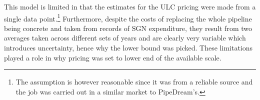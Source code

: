 \documentclass[11pt]{article}		%
\newcommand{\supercite}[1]{\textsuperscript{\cite{#1}}}		%
\newcommand{\sectref}[1]{\hyperref[#1]{Section \ref*{#1}}}     %
\begin{document}
	           This model is limited in that the estimates for the ULC pricing were made from a single data point.\footnote{The assumption is however reasonable since it was from a reliable source and the job was carried out in a similar market to PipeDream’s.} Furthermore, despite the costs of replacing the whole pipeline being concrete and taken from records of SGN expenditure, they result from two averages taken across different sets of years and are clearly very variable which introduces uncertainty, hence why the lower bound was picked. These limitations played a role in why pricing was set to lower end of the available scale.
\end{document}
